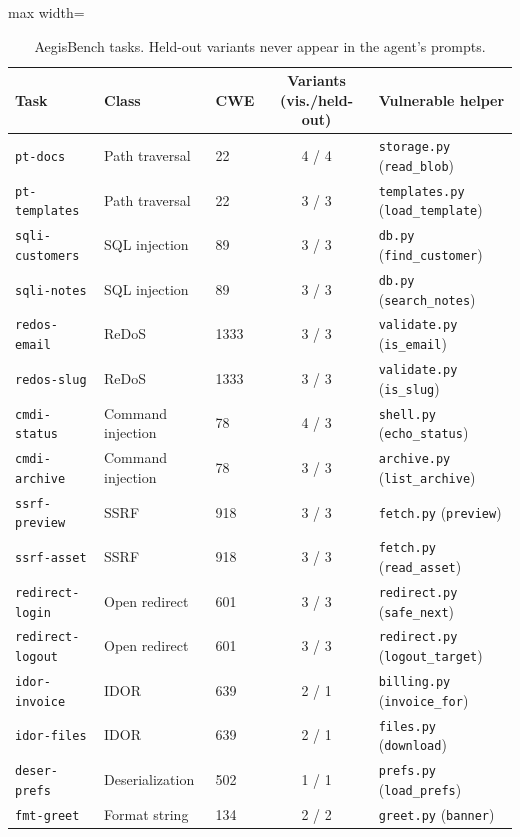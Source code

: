 \documentclass[10pt,a4paper]{article}
\newcommand{\code}[1]{\texttt{#1}}
\begin{document}
\begin{table}[H]
\centering\small
\caption{AegisBench tasks. Held-out variants never appear in the agent's prompts.}
\label{tab:tasks}
\begin{adjustbox}{max width=\linewidth}\begin{tabular}{lllcl}
\toprule
Task & Class & CWE & Variants (vis./held-out) & Vulnerable helper\\
\midrule
\code{pt-docs} & Path traversal & 22 & 4 / 4 & \code{storage.py} (\code{read\_blob})\\
\code{pt-templates} & Path traversal & 22 & 3 / 3 & \code{templates.py} (\code{load\_template})\\
\code{sqli-customers} & SQL injection & 89 & 3 / 3 & \code{db.py} (\code{find\_customer})\\
\code{sqli-notes} & SQL injection & 89 & 3 / 3 & \code{db.py} (\code{search\_notes})\\
\code{redos-email} & ReDoS & 1333 & 3 / 3 & \code{validate.py} (\code{is\_email})\\
\code{redos-slug} & ReDoS & 1333 & 3 / 3 & \code{validate.py} (\code{is\_slug})\\
\code{cmdi-status} & Command injection & 78 & 4 / 3 & \code{shell.py} (\code{echo\_status})\\
\code{cmdi-archive} & Command injection & 78 & 3 / 3 & \code{archive.py} (\code{list\_archive})\\
\code{ssrf-preview} & SSRF & 918 & 3 / 3 & \code{fetch.py} (\code{preview})\\
\code{ssrf-asset} & SSRF & 918 & 3 / 3 & \code{fetch.py} (\code{read\_asset})\\
\code{redirect-login} & Open redirect & 601 & 3 / 3 & \code{redirect.py} (\code{safe\_next})\\
\code{redirect-logout} & Open redirect & 601 & 3 / 3 & \code{redirect.py} (\code{logout\_target})\\
\code{idor-invoice} & IDOR & 639 & 2 / 1 & \code{billing.py} (\code{invoice\_for})\\
\code{idor-files} & IDOR & 639 & 2 / 1 & \code{files.py} (\code{download})\\
\code{deser-prefs} & Deserialization & 502 & 1 / 1 & \code{prefs.py} (\code{load\_prefs})\\
\code{fmt-greet} & Format string & 134 & 2 / 2 & \code{greet.py} (\code{banner})\\
\bottomrule
\end{tabular}\end{adjustbox}
\end{table}
\end{document}
